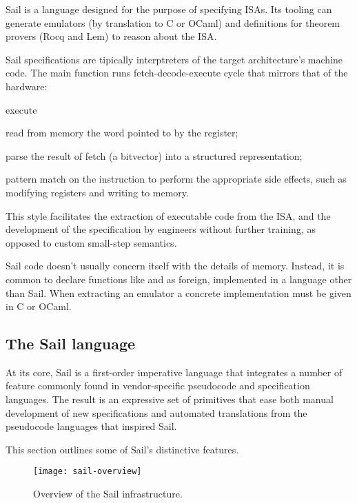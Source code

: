 Sail \cite{Armstrong} is a language designed for the purpose of specifying ISAs. Its tooling can generate emulators (by translation to C or OCaml) and definitions for theorem provers (\eg Rocq and Lem) to reason about the ISA.

Sail specifications are tipically interptreters of the target architecture's machine code. The main function runs fetch-decode-execute cycle that mirrors that of the hardware:
\begin{labeling}[~--]{execute}
\item[fetch] read from memory the word pointed to by the  register;
\item[decode] parse the result of fetch (a bitvector) into a structured representation;
\item[execute] pattern match on the instruction to perform the appropriate side effects, such as modifying registers and writing to memory.
\end{labeling}

This style facilitates the extraction of executable code from the ISA, and the development of the specification by engineers without further training, as opposed to \eg custom small-step semantics.

Sail code doesn't usually concern itself with the details of memory. Instead, it is common to declare functions like  and  as foreign, \ie implemented in a language other than Sail. When extracting an emulator a concrete implementation must be given in C or OCaml.

\subsection{The Sail language}

At its core, Sail is a first-order imperative language that integrates a number of feature commonly found in vendor-specific pseudocode and specification languages. The result is an expressive set of primitives that ease both manual development of new specifications and automated translations from the pseudocode languages that inspired Sail.

This section outlines some of Sail's distinctive features.

\begin{figure}
  \centering
  \texttt{[image: sail-overview]}
  \caption{Overview of the Sail infrastructure.}
  \label{fig:sail-overview}
\end{figure}

